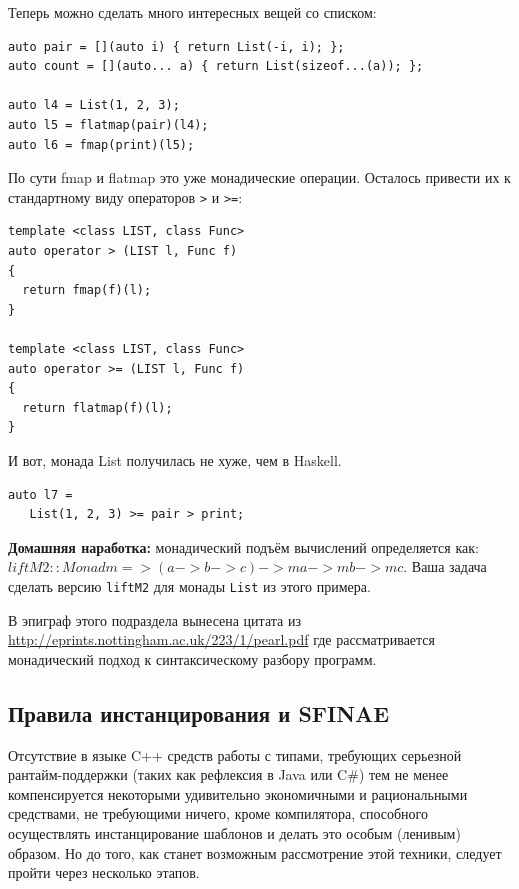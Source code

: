 \documentclass[a4paper,12pt,oneside]{article}
\begin{document}
Теперь можно сделать много интересных вещей со списком:
	
\begin{lstlisting}
auto pair = [](auto i) { return List(-i, i); };
auto count = [](auto... a) { return List(sizeof...(a)); };
 
auto l4 = List(1, 2, 3);
auto l5 = flatmap(pair)(l4);
auto l6 = fmap(print)(l5); 
\end{lstlisting}

По сути fmap и flatmap это уже монадические операции. Осталось привести их к стандартному виду операторов \lstinline!>! и \lstinline!>=!:

\begin{lstlisting}
template <class LIST, class Func>
auto operator > (LIST l, Func f)
{
  return fmap(f)(l);   
}
 
template <class LIST, class Func>
auto operator >= (LIST l, Func f)
{
  return flatmap(f)(l);   
}
\end{lstlisting}

И вот, монада List получилась не хуже, чем в Haskell.

\begin{lstlisting}
auto l7 = 
   List(1, 2, 3) >= pair > print;
\end{lstlisting}

\textbf{Домашняя наработка:} монадический подъём вычислений определяется как:
$liftM2 :: Monad m => (a -> b -> c) -> m a -> m b -> m c$.
Ваша задача сделать версию \lstinline!liftM2! для монады \lstinline!List! из этого примера.

В эпиграф этого подраздела вынесена цитата из \url{http://eprints.nottingham.ac.uk/223/1/pearl.pdf} где рассматривается монадический подход к синтаксическому разбору программ.

\pagebreak
\subsection{Правила инстанцирования и SFINAE}\label{SFINAESection}

Отсутствие в языке C++ средств работы с типами, требующих серьезной рантайм-поддержки (таких как рефлексия в Java или C\#) тем не менее компенсируется некоторыми удивительно экономичными и рациональными средствами, не требующими ничего, кроме компилятора, способного осуществлять инстанцирование шаблонов и делать это особым (ленивым) образом. Но до того, как станет возможным рассмотрение этой техники, следует пройти через несколько этапов.
\end{document}
